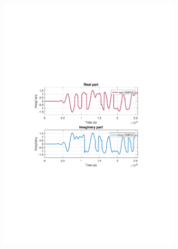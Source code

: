 \begin{refsection}
\begin{figure}[h!]
\centering
\begin{subfigure}{.5\textwidth}
  \centering
  \includegraphics[width=\linewidth]{./sdf/dsp_laser_phase_compensation/figures/S24_td_bps.pdf}
  \caption{}
  \label{fig:sub1}
\end{subfigure}%
\begin{subfigure}{.5\textwidth}
  \centering

\end{subfigure}
\end{figure}
\end{refsection}
